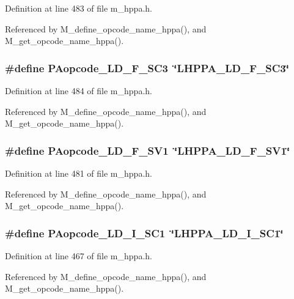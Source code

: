 Definition at line 483 of file m\_\-hppa.h.

Referenced by M\_\-define\_\-opcode\_\-name\_\-hppa(), and M\_\-get\_\-opcode\_\-name\_\-hppa().
\subsubsection{\setlength{\rightskip}{0pt plus 5cm}\#define PAopcode\_\-LD\_\-F\_\-SC3~\char`\"{}LHPPA\_\-LD\_\-F\_\-SC3\char`\"{}}\label{m__hppa_8h_5d951bf6e4e0dcee03a7d2cf8445ffc2}




Definition at line 484 of file m\_\-hppa.h.

Referenced by M\_\-define\_\-opcode\_\-name\_\-hppa(), and M\_\-get\_\-opcode\_\-name\_\-hppa().
\subsubsection{\setlength{\rightskip}{0pt plus 5cm}\#define PAopcode\_\-LD\_\-F\_\-SV1~\char`\"{}LHPPA\_\-LD\_\-F\_\-SV1\char`\"{}}\label{m__hppa_8h_aae8d8abb640e514f9fa828857f05402}




Definition at line 481 of file m\_\-hppa.h.

Referenced by M\_\-define\_\-opcode\_\-name\_\-hppa(), and M\_\-get\_\-opcode\_\-name\_\-hppa().
\subsubsection{\setlength{\rightskip}{0pt plus 5cm}\#define PAopcode\_\-LD\_\-I\_\-SC1~\char`\"{}LHPPA\_\-LD\_\-I\_\-SC1\char`\"{}}\label{m__hppa_8h_40689701088696114f7b17623380e3a8}




Definition at line 467 of file m\_\-hppa.h.

Referenced by M\_\-define\_\-opcode\_\-name\_\-hppa(), and M\_\-get\_\-opcode\_\-name\_\-hppa().
